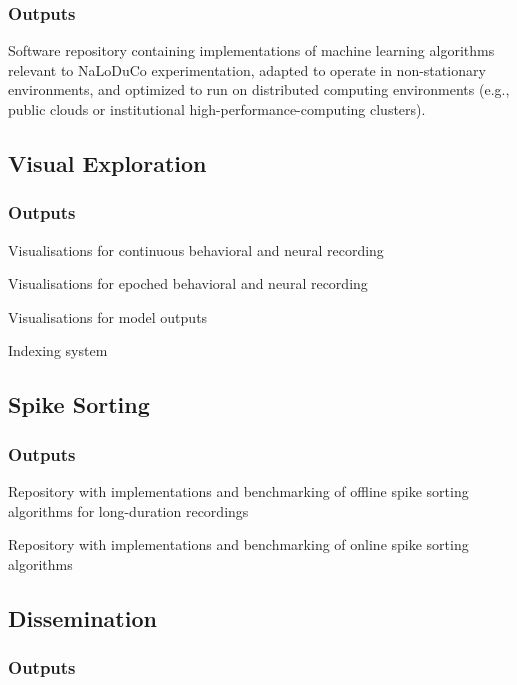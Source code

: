 \documentclass[12pt]{article}
\begin{document}
\subsubsection{Outputs}
\label{sec:outputOfflineAnalysis}

Software repository containing implementations of machine learning algorithms
relevant to NaLoDuCo experimentation, adapted to operate in non-stationary
environments,
and optimized to run on distributed computing environments (e.g., public clouds
or institutional high-performance-computing clusters).

\subsection{Visual Exploration}
\label{sec:visualExploration}

\subsubsection{Outputs}

Visualisations for continuous behavioral and neural recording

Visualisations for epoched behavioral and neural recording

Visualisations for model outputs

Indexing system

\subsection{Spike Sorting}

\subsubsection{Outputs}

Repository with implementations and benchmarking of offline spike sorting algorithms for long-duration recordings

Repository with implementations and benchmarking of online spike sorting algorithms

\subsection{Dissemination}
\label{sec:dissemination}

\subsubsection{Outputs}
\end{document}
